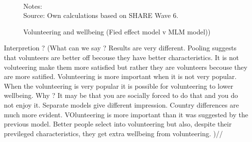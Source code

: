 \documentclass[10pt, letterpaper]{article}
\begin{document}
\begin{spacing}{1.4}
  \begin{figure}[H]
\centering
\caption{Volunteering and wellbeing (Fied effect model v MLM model))} 
\label{fig:casp_ols}
\begin{minipage}{1\linewidth}
\quad
{} ~\\
{\footnotesize Notes: }~\\
{\footnotesize Source: Own calculations based on SHARE Wave 6.}
\end{minipage}
\end{figure} 

Interpretion ? (What can we say ? Results are very different. Pooling suggests that volunteers are better off becouse they have better characteristics. It is not voluteering make them more satisfied but rather they are volunteers becouse they are more satified. Volunteering is more important when it is not very popular. When the volunteering is very popular it is possible for volunteering to lower wellbeing. Why ? It may be that you are socially forced to do that and you do not enjoy it. Separate models give different impression. Country differences are much more evident. VOlunteering is more important than it was suggested by the previous model. Better people select into volunteering but also, despite their previleged characteristics, they get extra wellbeing from volunteering. )//




\end{spacing}
\end{document}
